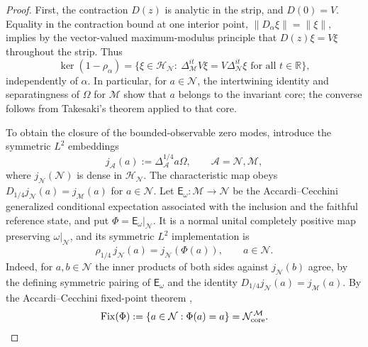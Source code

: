 \documentclass[a4paper,11pt]{article}
\theoremstyle{definition}
\newcommand{\mA}{\mathcal{A}}%
\newcommand{\mN}{\mathcal{N}}
\newcommand{\mH}{\mathcal{H}}
\newcommand{\mM}{\mathcal{M}}
\begin{document}
\begin{proof}
First, the contraction $D(z)$ is analytic in the strip, and
$D(0)=V$. Equality in the contraction bound at one interior point,
$\|D_\alpha\xi\|=\|\xi\|$, implies by the vector-valued
maximum-modulus principle that $D(z)\xi=V\xi$ throughout the strip.
Thus
\begin{equation}
 \ker(1-\rho_\alpha)
 =\{\xi\in\mH_\mN:\ 
     \Delta_\mM^{it}V\xi=V\Delta_\mN^{it}\xi
       \text{ for all }t\in\mathbb R\},
 \label{eq:Q-kernel-modular-intertwining}
\end{equation}
independently of $\alpha$. In particular, for $a\in\mN$, the
intertwining identity and separatingness of $\Omega$ for $\mM$
show that $a$ belongs to the invariant core; the converse follows
from Takesaki's theorem applied to that core.

To obtain the closure of the bounded-observable zero modes, introduce
the symmetric $L^2$ embeddings
\begin{equation}
 j_\mA(a):=\Delta_\mA^{1/4}a\Omega,
 \qquad \mA=\mN,\mM,
 \label{eq:Q-symmetric-embedding}
\end{equation}
where $j_\mN(\mN)$ is dense in $\mH_\mN$.
The characteristic map obeys
$D_{1/4}j_\mN(a)=j_\mM(a)$ for $a\in\mN$.
Let $\mathsf E_\omega:\mM\to\mN$ be the
Accardi--Cecchini generalized conditional expectation associated
with the inclusion and the faithful reference state, and put
$\Phi=\mathsf E_\omega|_\mN$. It is a normal unital completely
positive map preserving $\omega|_\mN$, and its symmetric $L^2$
implementation is
\begin{equation}
 \boxed{\rho_{1/4}\,j_\mN(a)=j_\mN(\Phi(a)),
 \qquad a\in\mN.}
 \label{eq:Q-AC-L2}
\end{equation}
Indeed, for $a,b\in\mN$ the inner products of both sides
against $j_\mN(b)$ agree, by the defining symmetric pairing of
$\mathsf E_\omega$ and the identity
$D_{1/4}j_\mN(a)=j_\mM(a)$. By the
Accardi--Cecchini fixed-point theorem \cite{AccardiCecchini1982},
\begin{equation}
 \operatorname{Fix}(\Phi)
 :=\{a\in\mN:\Phi(a)=a\}
 =\mN_{\rm core}^{\,\mM}.
 \label{eq:Q-AC-fixed-point}
\end{equation}


\end{proof}
\end{document}
